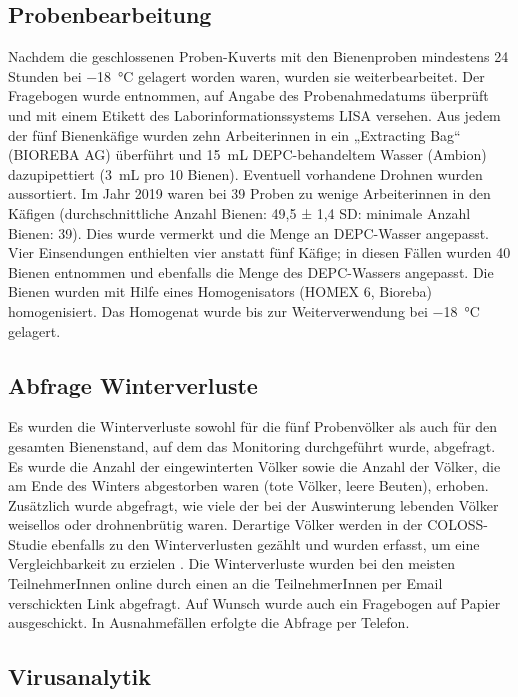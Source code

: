 \subsection{Probenbearbeitung} \label{chap:probenbearbeitung}

Nachdem die geschlossenen Proben-Kuverts mit den Bienenproben mindestens 24 Stunden bei \SI{-18}{\degreeCelsius} gelagert worden waren, wurden sie weiterbearbeitet. Der Fragebogen wurde entnommen, auf Angabe des Probenahmedatums überprüft und mit einem Etikett des Laborinformationssystems LISA versehen. Aus jedem der fünf Bienenkäfige wurden zehn Arbeiterinnen in ein „Extracting Bag“ (BIOREBA AG) überführt und \SI{15}{\milli\liter} DEPC-behandeltem Wasser (Ambion) dazupipettiert (\SI{3}{\milli\liter} pro 10 Bienen). Eventuell vorhandene Drohnen wurden aussortiert. Im Jahr 2019 waren bei 39 Proben zu wenige Arbeiterinnen in den Käfigen (durchschnittliche Anzahl Bienen: 49,5 ± 1,4 SD: minimale Anzahl Bienen: 39). Dies wurde vermerkt und die Menge an DEPC-Wasser angepasst. Vier Einsendungen enthielten vier anstatt fünf Käfige; in diesen Fällen wurden 40 Bienen entnommen und ebenfalls die Menge des DEPC-Wassers angepasst. Die Bienen wurden mit Hilfe eines Homogenisators (HOMEX 6, Bioreba) homogenisiert. Das Homogenat wurde bis zur Weiterverwendung bei \SI{-18}{\degreeCelsius} gelagert.

\subsection{Abfrage Winterverluste} \label{chap:erhebung_winterv}

Es wurden die Winterverluste sowohl für die fünf Probenvölker als auch für den gesamten Bienenstand, auf dem das Monitoring durchgeführt wurde, abgefragt. Es wurde die Anzahl der eingewinterten Völker sowie die Anzahl der Völker, die am Ende des Winters abgestorben waren (tote Völker, leere Beuten), erhoben. Zusätzlich wurde abgefragt, wie viele der bei der Auswinterung lebenden Völker weisellos oder drohnenbrütig waren. Derartige Völker werden in der COLOSS-Studie ebenfalls zu den Winterverlusten gezählt und wurden erfasst, um eine Vergleichbarkeit zu erzielen \citep{brodschneider2016,brodschneider2018}. Die Winterverluste wurden bei den meisten TeilnehmerInnen online durch einen an die TeilnehmerInnen per Email verschickten Link abgefragt. Auf Wunsch wurde auch ein Fragebogen auf Papier ausgeschickt. In Ausnahmefällen erfolgte die Abfrage per Telefon.

\subsection{Virusanalytik} \label{chap:virusanalytik}

